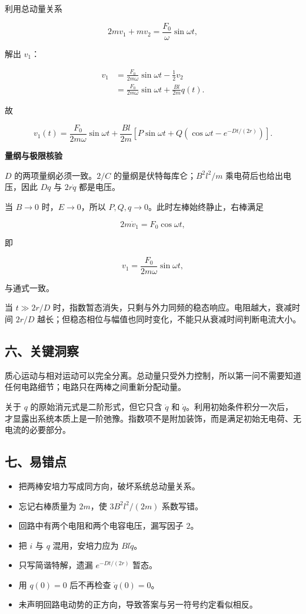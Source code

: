 \documentclass[12pt,a4paper,UTF8]{ctexart}
\newcommand{\tightlist}{\setlength{\itemsep}{0pt}\setlength{\parskip}{0pt}}
\begin{document}
利用总动量关系

\[2mv_1+mv_2=\frac{F_0}{\omega}\sin\omega t,\]

解出 \(v_1\)：

\[
\begin{aligned}
v_1
&=\frac{F_0}{2m\omega}\sin\omega t-\frac12v_2\\
&=\frac{F_0}{2m\omega}\sin\omega t+\frac{Bl}{2m}q(t).
\end{aligned}
\]

故

\[
\boxed{
v_1(t)=\frac{F_0}{2m\omega}\sin\omega t
+\frac{Bl}{2m}\left[P\sin\omega t+Q\left(\cos\omega t-e^{-Dt/(2r)}\right)\right]
}.
\]

\textbf{量纲与极限核验}

\(D\) 的两项量纲必须一致。\(2/C\) 的量纲是伏特每库仑；\(B^2l^2/m\)
乘电荷后也给出电压，因此 \(Dq\) 与 \(2r\dot q\) 都是电压。

当 \(B\to0\) 时，\(E\to0\)，所以
\(P,Q,q\to0\)。此时左棒始终静止，右棒满足

\[2m\dot v_1=F_0\cos\omega t,\]

即

\[v_1=\frac{F_0}{2m\omega}\sin\omega t,\]

与通式一致。

当 \(t\gg2r/D\)
时，指数暂态消失，只剩与外力同频的稳态响应。电阻越大，衰减时间 \(2r/D\)
越长；但稳态相位与幅值也同时变化，不能只从衰减时间判断电流大小。

\subsection{六、关键洞察}\label{ux516dux5173ux952eux6d1eux5bdf-2}

质心运动与相对运动可以完全分离。总动量只受外力控制，所以第一问不需要知道任何电路细节；电路只在两棒之间重新分配动量。

关于 \(q\) 的原始消元式是二阶形式，但它只含 \(\ddot q\) 和
\(\dot q\)。利用初始条件积分一次后，才显露出系统本质上是一阶弛豫。指数项不是附加装饰，而是满足初始无电荷、无电流的必要部分。

\subsection{七、易错点}\label{ux4e03ux6613ux9519ux70b9-2}

\begin{itemize}
\tightlist
\item
  把两棒安培力写成同方向，破坏系统总动量关系。
\item
  忘记右棒质量为 \(2m\)，使 \(3B^2l^2/(2m)\) 系数写错。
\item
  回路中有两个电阻和两个电容电压，漏写因子 \(2\)。
\item
  把 \(i\) 与 \(q\) 混用，安培力应为 \(Bl\dot q\)。
\item
  只写简谐特解，遗漏 \(e^{-Dt/(2r)}\) 暂态。
\item
  用 \(q(0)=0\) 后不再检查 \(\dot q(0)=0\)。
\item
  未声明回路电动势的正方向，导致答案与另一符号约定看似相反。
\end{itemize}
\end{document}
